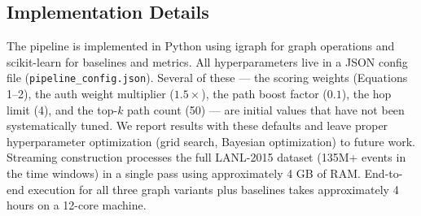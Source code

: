 \subsection{Implementation Details}

The pipeline is implemented in Python using igraph for graph operations and scikit-learn for baselines and metrics. All hyperparameters live in a JSON config file (\texttt{pipeline\_config.json}). Several of these --- the scoring weights (Equations 1--2), the auth weight multiplier ($1.5\times$), the path boost factor ($0.1$), the hop limit (4), and the top-$k$ path count (50) --- are initial values that have not been systematically tuned. We report results with these defaults and leave proper hyperparameter optimization (grid search, Bayesian optimization) to future work. Streaming construction processes the full LANL-2015 dataset (135M+ events in the time windows) in a single pass using approximately 4 GB of RAM. End-to-end execution for all three graph variants plus baselines takes approximately 4 hours on a 12-core machine.
